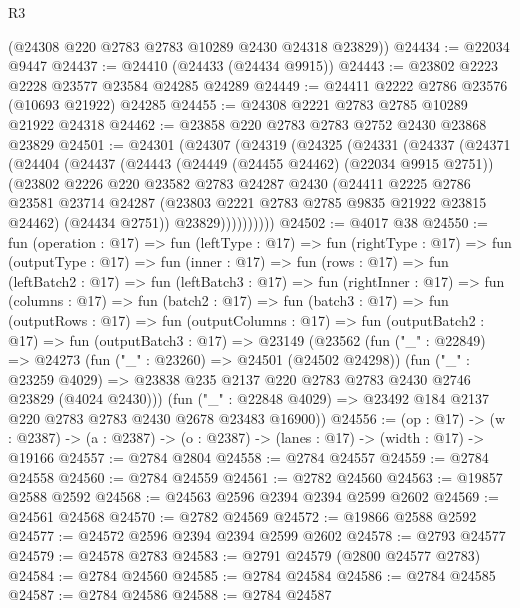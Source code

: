\begin{lexlean}{R3}
\begin{coremodule}
      (@24308 @220 @2783 @2783 @10289 @2430 @24318 @23829))
@24434 := @22034 @9447
@24437 := @24410 (@24433 (@24434 @9915))
@24443 := @23802 @2223 @2228 @23577 @23584 @24285 @24289
@24449 := @24411 @2222 @2786 @23576 (@10693 @21922) @24285
@24455 := @24308 @2221 @2783 @2785 @10289 @21922 @24318
@24462 := @23858 @220 @2783 @2783 @2752 @2430 @23868 @23829
@24501 := @24301
    (@24307
      (@24319
        (@24325
          (@24331
            (@24337
              (@24371
                (@24404
                  (@24437
                    (@24443
                      (@24449 (@24455 @24462) (@22034 @9915 @2751))
                      (@23802
                        @2226
                        @220
                        @23582
                        @2783
                        @24287
                        @2430
                        (@24411
                          @2225
                          @2786
                          @23581
                          @23714
                          @24287
                          (@23803 @2221 @2783 @2785 @9835 @21922 @23815 @24462)
                          (@24434 @2751))
                        @23829))))))))))
@24502 := @4017 @38
@24550 := fun (operation : @17) =>
  fun (leftType : @17) =>
  fun (rightType : @17) =>
  fun (outputType : @17) =>
  fun (inner : @17) =>
  fun (rows : @17) =>
  fun (leftBatch2 : @17) =>
  fun (leftBatch3 : @17) =>
  fun (rightInner : @17) =>
  fun (columns : @17) =>
  fun (batch2 : @17) =>
  fun (batch3 : @17) =>
  fun (outputRows : @17) =>
  fun (outputColumns : @17) =>
  fun (outputBatch2 : @17) =>
  fun (outputBatch3 : @17) =>
  @23149
    (@23562
      (fun ("_" : @22849) =>
      @24273
        (fun ("_" : @23260) => @24501 (@24502 @24298))
        (fun ("_" : @23259 @4029) =>
        @23838 @235 @2137 @220 @2783 @2783 @2430 @2746 @23829 (@4024 @2430)))
      (fun ("_" : @22848 @4029) => @23492 @184 @2137 @220 @2783 @2783 @2430 @2678 @23483 @16900))
@24556 := (op : @17) ->
  (w : @2387) -> (a : @2387) -> (o : @2387) -> (lanes : @17) -> (width : @17) -> @19166
@24557 := @2784 @2804
@24558 := @2784 @24557
@24559 := @2784 @24558
@24560 := @2784 @24559
@24561 := @2782 @24560
@24563 := @19857 @2588 @2592
@24568 := @24563 @2596 @2394 @2394 @2599 @2602
@24569 := @24561 @24568
@24570 := @2782 @24569
@24572 := @19866 @2588 @2592
@24577 := @24572 @2596 @2394 @2394 @2599 @2602
@24578 := @2793 @24577
@24579 := @24578 @2783
@24583 := @2791 @24579 (@2800 @24577 @2783)
@24584 := @2784 @24560
@24585 := @2784 @24584
@24586 := @2784 @24585
@24587 := @2784 @24586
@24588 := @2784 @24587

\end{coremodule}
\end{lexlean}
